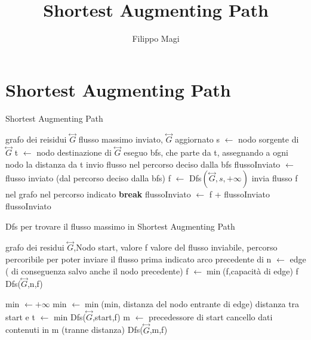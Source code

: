 \documentclass{article}
\title{Shortest Augmenting Path}
\author{Filippo Magi }
\begin{document}
\maketitle

\section{Shortest Augmenting Path}
\begin{algorithm}
\caption{Shortest Augmenting Path}
\begin{algorithmic}
\REQUIRE grafo dei reisidui $\overset{\leftrightarrow}{G}$
\ENSURE flusso massimo inviato, $\overset{\leftrightarrow}{G}$ aggiornato
\STATE s $\leftarrow$ nodo sorgente di $\overset{\leftrightarrow}{G}$
\STATE t $\leftarrow$ nodo destinazione di $\overset{\leftrightarrow}{G}$
\STATE eseguo bfs, che parte da t, assegnando a ogni nodo la distanza da t 
\STATE invio flusso nel percorso deciso dalla bfs
\STATE flussoInviato $\leftarrow$ flusso inviato (dal percorso deciso dalla bfs)
\STATE f $\leftarrow$ Dfs$(\overset{\leftrightarrow}{G}, s, +\infty)$
\STATE invia flusso f nel grafo nel percorso indicato
\ELSE
\STATE \textbf{break}
\ENDIF
\STATE flussoInviato $\leftarrow$ f + flussoInviato 
\ENDWHILE
\RETURN flussoInviato
\end{algorithmic}
\end{algorithm}
\begin{algorithm}
\caption{Dfs per trovare il flusso massimo in Shortest Augmenting Path}
\begin{algorithmic}
\REQUIRE grafo dei residui  $\overset{\leftrightarrow}{G}$,Nodo start, valore f
\ENSURE valore del flusso inviabile, percorso percoribile per poter inviare il flusso prima indicato
\STATE arco precedente di n $\leftarrow$ edge ( di conseguenza salvo anche il nodo precedente)
\STATE f $\leftarrow \min$(f,capacità di edge)
\RETURN f
\ENDIF
\RETURN Dfs($\overset{\leftrightarrow}{G}$,n,f)
\ENDIF
\ENDFOR

\STATE min $\leftarrow +\infty$
\STATE min $\leftarrow \min$(min, distanza del nodo entrante di edge)
\ENDIF
\ENDFOR
\STATE distanza tra start e t $\leftarrow$ min
\RETURN Dfs($\overset{\leftrightarrow}{G}$,start,f)
\ELSE
\STATE m $\leftarrow$ precedessore di start
\STATE cancello dati contenuti in m (tranne distanza)
\RETURN Dfs($\overset{\leftrightarrow}{G}$,m,f)
\ENDIF
\ENDIF
{}
\end{algorithmic}
\end{algorithm}
\end{document}
